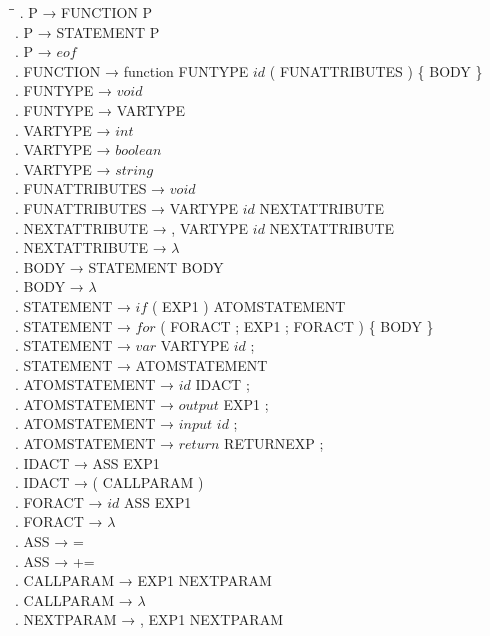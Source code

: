 \begin{tabbing}
    \hspace{1cm}\=\hspace{10cm}\=\kill
    . P → FUNCTION P\\
    . P → STATEMENT P\\
    . P → $eof$\\
    . FUNCTION → function FUNTYPE $id$ ( FUNATTRIBUTES ) \{ BODY \}\\
    . FUNTYPE → $void$\\
    . FUNTYPE → VARTYPE\\
    . VARTYPE → $int$\\
    . VARTYPE → $boolean$\\
    . VARTYPE → $string$\\
    . FUNATTRIBUTES → $void$\\
    . FUNATTRIBUTES → VARTYPE $id$ NEXTATTRIBUTE\\
    . NEXTATTRIBUTE → , VARTYPE $id$ NEXTATTRIBUTE\\
    . NEXTATTRIBUTE → $\lambda$\\
    . BODY → STATEMENT BODY\\
    . BODY → $\lambda$\\
    . STATEMENT → $if$ ( EXP1 ) ATOMSTATEMENT\\
    . STATEMENT → $for$ ( FORACT ; EXP1 ; FORACT ) \{ BODY \}\\
    . STATEMENT → $var$ VARTYPE $id$ ;\\
    . STATEMENT → ATOMSTATEMENT\\
    . ATOMSTATEMENT → $id$ IDACT ;\\
    . ATOMSTATEMENT → $output$ EXP1 ;\\
    . ATOMSTATEMENT → $input$ $id$ ;\\
    . ATOMSTATEMENT → $return$ RETURNEXP ;\\
    . IDACT → ASS EXP1\\
    . IDACT → ( CALLPARAM )\\
    . FORACT → $id$ ASS EXP1\\
    . FORACT → $\lambda$\\
    . ASS → =\\
    . ASS → +=\\
    . CALLPARAM → EXP1 NEXTPARAM\\
    . CALLPARAM → $\lambda$\\
    . NEXTPARAM → , EXP1 NEXTPARAM\\

\end{tabbing}
